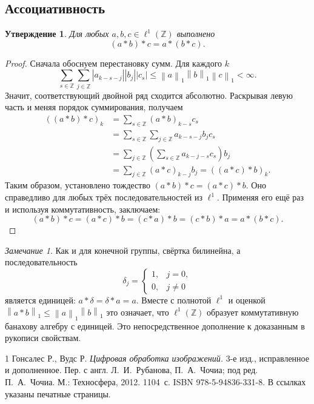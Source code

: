 \documentclass[12pt,a4paper]{article}
\newtheorem{proposition}{Утверждение}
\theoremstyle{definition}
\theoremstyle{remark}
\newtheorem*{remark}{Замечание}
\newcommand{\ZZ}{\mathbb{Z}}
\newcommand{\norm}[1]{\left\lVert #1\right\rVert}
\begin{document}
\subsection{Ассоциативность}

\begin{proposition}
Для любых $a,b,c\in\ell^1(\ZZ)$ выполнено
\[
  (a*b)*c=a*(b*c).
\]
\end{proposition}

\begin{proof}
Сначала обоснуем перестановку сумм. Для каждого $k$
\[
  \sum_{s\in\ZZ}\sum_{j\in\ZZ}
    |a_{k-s-j}||b_j||c_s|
  \leqslant\norm{a}_1\norm{b}_1\norm{c}_1<\infty.
\]
Значит, соответствующий двойной ряд сходится абсолютно.
Раскрывая левую часть и меняя порядок суммирования, получаем
\begin{align*}
  ((a*b)*c)_k
  &=\sum_{s\in\ZZ}(a*b)_{k-s}c_s\\
  &=\sum_{s\in\ZZ}\sum_{j\in\ZZ}a_{k-s-j}b_jc_s\\
  &=\sum_{j\in\ZZ}\left(\sum_{s\in\ZZ}a_{k-j-s}c_s\right)b_j\\
  &=\sum_{j\in\ZZ}(a*c)_{k-j}b_j
   =((a*c)*b)_k.
\end{align*}
Таким образом, установлено тождество $(a*b)*c=(a*c)*b$.
Оно справедливо для любых трёх последовательностей из $\ell^1$.
Применяя его ещё раз и используя коммутативность, заключаем:
\[
  (a*b)*c=(a*c)*b=(c*a)*b=(c*b)*a=a*(b*c).
\]
\end{proof}

\begin{remark}
Как и для конечной группы, свёртка билинейна, а последовательность
\[
  \delta_j=\begin{cases}1,&j=0,\\0,&j\ne0\end{cases}
\]
является единицей: $a*\delta=\delta*a=a$. Вместе с полнотой $\ell^1$
и оценкой $\norm{a*b}_1\leqslant\norm{a}_1\norm{b}_1$ это означает,
что $\ell^1(\ZZ)$ образует коммутативную банахову алгебру с единицей.
Это непосредственное дополнение к доказанным в рукописи свойствам.
\end{remark}

\begingroup
\small
\begin{thebibliography}{1}
Гонсалес Р., Вудс Р.
\emph{Цифровая обработка изображений.}
3-е изд., исправленное и дополненное.
Пер. с англ. Л.~И.~Рубанова, П.~А.~Чочиа;
под ред. П.~А.~Чочиа. М.: Техносфера, 2012. 1104~с.
ISBN 978-5-94836-331-8.
В ссылках указаны печатные страницы.
\end{thebibliography}
\endgroup
\end{document}
